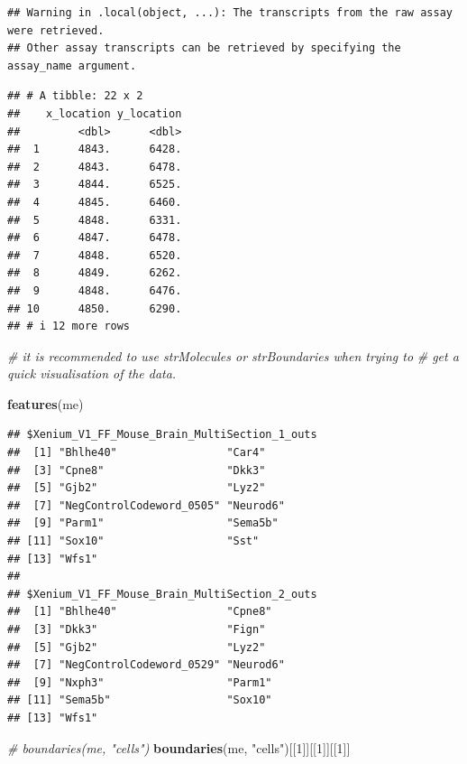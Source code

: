 \documentclass[
]{article}
\newenvironment{Shaded}{\begin{snugshade}}{\end{snugshade}}
\newcommand{\CommentTok}[1]{\textcolor[rgb]{0.56,0.35,0.01}{\textit{#1}}}
\newcommand{\DecValTok}[1]{\textcolor[rgb]{0.00,0.00,0.81}{#1}}
\newcommand{\KeywordTok}[1]{\textcolor[rgb]{0.13,0.29,0.53}{\textbf{#1}}}
\newcommand{\NormalTok}[1]{#1}
\newcommand{\StringTok}[1]{\textcolor[rgb]{0.31,0.60,0.02}{#1}}
\begin{document}
\begin{verbatim}
## Warning in .local(object, ...): The transcripts from the raw assay were retrieved.
## Other assay transcripts can be retrieved by specifying the assay_name argument.
\end{verbatim}

\begin{verbatim}
## # A tibble: 22 x 2
##    x_location y_location
##         <dbl>      <dbl>
##  1      4843.      6428.
##  2      4843.      6478.
##  3      4844.      6525.
##  4      4845.      6460.
##  5      4848.      6331.
##  6      4847.      6478.
##  7      4848.      6520.
##  8      4849.      6262.
##  9      4848.      6476.
## 10      4850.      6290.
## # i 12 more rows
\end{verbatim}

\begin{Shaded}
\begin{Highlighting}[]
\CommentTok{\# it is recommended to use strMolecules or strBoundaries when trying to}
\CommentTok{\# get a quick visualisation of the data.}
\end{Highlighting}
\end{Shaded}

\begin{Shaded}
\begin{Highlighting}[]
\KeywordTok{features}\NormalTok{(me)}
\end{Highlighting}
\end{Shaded}

\begin{verbatim}
## $Xenium_V1_FF_Mouse_Brain_MultiSection_1_outs
##  [1] "Bhlhe40"                 "Car4"                   
##  [3] "Cpne8"                   "Dkk3"                   
##  [5] "Gjb2"                    "Lyz2"                   
##  [7] "NegControlCodeword_0505" "Neurod6"                
##  [9] "Parm1"                   "Sema5b"                 
## [11] "Sox10"                   "Sst"                    
## [13] "Wfs1"                   
## 
## $Xenium_V1_FF_Mouse_Brain_MultiSection_2_outs
##  [1] "Bhlhe40"                 "Cpne8"                  
##  [3] "Dkk3"                    "Fign"                   
##  [5] "Gjb2"                    "Lyz2"                   
##  [7] "NegControlCodeword_0529" "Neurod6"                
##  [9] "Nxph3"                   "Parm1"                  
## [11] "Sema5b"                  "Sox10"                  
## [13] "Wfs1"
\end{verbatim}

\begin{Shaded}
\begin{Highlighting}[]
\CommentTok{\# boundaries(me, "cells")}
\KeywordTok{boundaries}\NormalTok{(me, }\StringTok{"cells"}\NormalTok{)[[}\DecValTok{1}\NormalTok{]][[}\DecValTok{1}\NormalTok{]][[}\DecValTok{1}\NormalTok{]]}
\end{Highlighting}
\end{Shaded}
\end{document}
